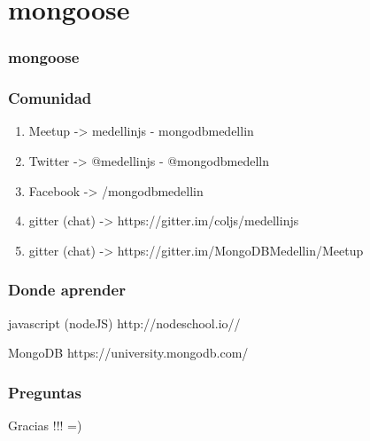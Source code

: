 \documentclass{beamer}
\begin{document}
\section{mongoose}
\begin{frame}
\frametitle{mongoose}
\end{frame}

\begin{frame}
\frametitle{Comunidad}
\begin{enumerate}
\item Meetup -> medellinjs  - mongodbmedellin
\pause
\item Twitter -> @medellinjs - @mongodbmedelln
\pause
\item Facebook -> /mongodbmedellin
\pause
\item gitter (chat) -> https://gitter.im/coljs/medellinjs
\pause
\item gitter (chat) -> https://gitter.im/MongoDBMedellin/Meetup
\end{enumerate}
\end{frame}
\begin{frame}
\frametitle{Donde aprender}
\footnotesize{
\begin{thebibliography}{99} %
 javascript (nodeJS)
\newblock http://nodeschool.io//
\end{thebibliography}
}

\footnotesize{
\begin{thebibliography}{99} %
 MongoDB
\newblock https://university.mongodb.com/
\end{thebibliography}
}
\end{frame}

\begin{frame}
\frametitle{Preguntas}
\end{frame}

\begin{frame}
\Huge{\centerline{Gracias !!! =)}}
\end{frame}
\end{document}
